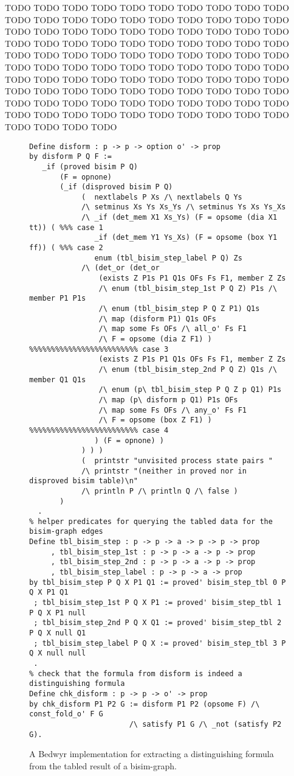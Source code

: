 \documentclass{llncs}
\begin{document}
TODO TODO TODO TODO TODO TODO TODO TODO TODO TODO TODO TODO TODO
TODO TODO TODO TODO TODO TODO TODO TODO TODO TODO TODO TODO TODO
TODO TODO TODO TODO TODO TODO TODO TODO TODO TODO TODO TODO TODO
TODO TODO TODO TODO TODO TODO TODO TODO TODO TODO TODO TODO TODO
TODO TODO TODO TODO TODO TODO TODO TODO TODO TODO TODO TODO TODO
TODO TODO TODO TODO TODO TODO TODO TODO TODO TODO TODO TODO TODO
TODO TODO TODO TODO TODO TODO TODO TODO TODO TODO TODO TODO TODO
TODO TODO TODO TODO TODO TODO TODO TODO TODO TODO TODO TODO TODO

\begin{figure}
\begin{lstlisting}
Define disform : p -> p -> option o' -> prop
by disform P Q F :=
   _if (proved bisim P Q)
       (F = opnone)
       (_if (disproved bisim P Q)
            (  nextlabels P Xs /\ nextlabels Q Ys
            /\ setminus Xs Ys Xs_Ys /\ setminus Ys Xs Ys_Xs
            /\ _if (det_mem X1 Xs_Ys) (F = opsome (dia X1 tt)) ( %%% case 1
               _if (det_mem Y1 Ys_Xs) (F = opsome (box Y1 ff)) ( %%% case 2
               enum (tbl_bisim_step_label P Q) Zs
            /\ (det_or (det_or
                (exists Z P1s P1 Q1s OFs Fs F1, member Z Zs
                /\ enum (tbl_bisim_step_1st P Q Z) P1s /\ member P1 P1s
                /\ enum (tbl_bisim_step P Q Z P1) Q1s
                /\ map (disform P1) Q1s OFs
                /\ map some Fs OFs /\ all_o' Fs F1
                /\ F = opsome (dia Z F1) ) %%%%%%%%%%%%%%%%%%%%%%%%% case 3
                (exists Z P1s P1 Q1s OFs Fs F1, member Z Zs
                /\ enum (tbl_bisim_step_2nd P Q Z) Q1s /\ member Q1 Q1s 
                /\ enum (p\ tbl_bisim_step P Q Z p Q1) P1s
                /\ map (p\ disform p Q1) P1s OFs
                /\ map some Fs OFs /\ any_o' Fs F1
                /\ F = opsome (box Z F1) ) %%%%%%%%%%%%%%%%%%%%%%%%% case 4
               ) (F = opnone) )
            ) ) )
            (  printstr "unvisited process state pairs "
            /\ printstr "(neither in proved nor in disproved bisim table)\n"
            /\ println P /\ println Q /\ false )
       )
  .
% helper predicates for querying the tabled data for the bisim-graph edges
Define tbl_bisim_step : p -> p -> a -> p -> p -> prop
     , tbl_bisim_step_1st : p -> p -> a -> p -> prop
     , tbl_bisim_step_2nd : p -> p -> a -> p -> prop
     , tbl_bisim_step_label : p -> p -> a -> prop
by tbl_bisim_step P Q X P1 Q1 := proved' bisim_step_tbl 0 P Q X P1 Q1
 ; tbl_bisim_step_1st P Q X P1 := proved' bisim_step_tbl 1 P Q X P1 null
 ; tbl_bisim_step_2nd P Q X Q1 := proved' bisim_step_tbl 2 P Q X null Q1
 ; tbl_bisim_step_label P Q X := proved' bisim_step_tbl 3 P Q X null null
 .
% check that the formula from disform is indeed a distinguishing formula
Define chk_disform : p -> p -> o' -> prop
by chk_disform P1 P2 G := disform P1 P2 (opsome F) /\ const_fold_o' F G
                       /\ satisfy P1 G /\ _not (satisfy P2 G).
\end{lstlisting}
\vspace*{-3ex}
\caption{A Bedwyr implementation for
  extracting a distinguishing formula from the tabled result
  of a bisim-graph.}
\label{fig:hml}
\end{figure}
\end{document}

